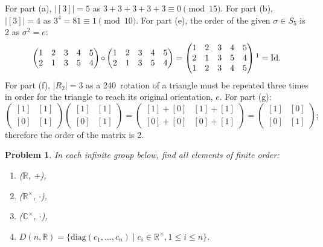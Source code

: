 \documentclass[12pt]{article}
\newtheorem{problem}{Problem}
\numberwithin{problem}{section} %
\theoremstyle{remark}  %
\newenvironment{answer}
    {\begin{adjustwidth}{0pt}{0pt}}
    {\end{adjustwidth}}
\begin{document}
    \begin{answer}
        For part (a), $|[3]|=5$ as $3 + 3 + 3 + 3 + 3 \equiv 0 \pmod{15}$. For part (b), $|[3]|=4$ as $3^4=81\equiv 1 \pmod{10}$. For part (e), the order of the given $\sigma\in S_5$ is 2 as $\sigma^2=e$: $$\begin{pmatrix}
            1 & 2 & 3 & 4 & 5 \\
            2 & 1 & 3 & 5 & 4
        \end{pmatrix} \operatorname{\circ} \begin{pmatrix}
            1 & 2 & 3 & 4 & 5 \\
            2 & 1 & 3 & 5 & 4
        \end{pmatrix} = \begin{pmatrix}
            1 & 2 & 3 & 4 & 5 \\
            2 & 1 & 3 & 5 & 4 \\
            1 & 2 & 3 & 4 & 5
        \end{pmatrix}\footnotemark= \text{Id}.
        $$  For part (f), $|R_2|=3$ as a 240\textdegree\ rotation of a triangle must be repeated three times in order for the triangle to reach its original orientation, $e$. For part (g): $$ \begin{pmatrix}
                [1] & [1] \\
                [0] & [1]
            \end{pmatrix}
            \begin{pmatrix}
                [1] & [1] \\
                [0] & [1]
            \end{pmatrix} = 
            \begin{pmatrix}
                [1] + [0] & [1] + [1] \\
                [0] + [0] & [0] + [1]
            \end{pmatrix} =
            \begin{pmatrix}
                [1] & [0] \\
                [0] & [1]
            \end{pmatrix};
        $$ therefore the order of the matrix is 2.
    \end{answer}
    \begin{problem}
        In each infinite group below, find all elements of finite order:
        \begin{enumerate}[label=(\alph*)]
            \item ($\mathbb{R}$, +),
            \item ($\mathbb{R}^\times$, $\cdot$),
            \item ($\mathbb{C}^\times$, $\cdot$),
            \item $D(n,\mathbb{R}) = \{\text{diag}(c_1,\dots,c_n)\operatorname{|}c_i\in \mathbb{R}^\times, 1 \leq i \leq n\}$.
        \end{enumerate}
    \end{problem}
\end{document}
